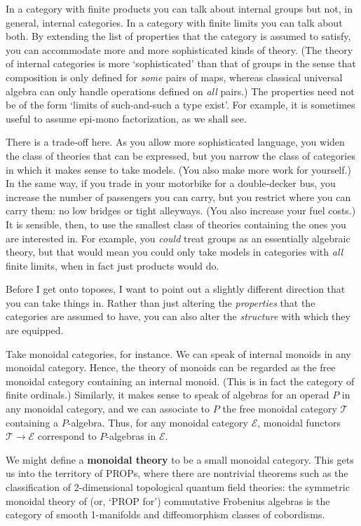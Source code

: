 \documentclass[12pt]{article}
\newcommand{\cat}[1]{\mathscr{#1}}
\newcommand{\demph}[1]{\textbf{\textup{#1}}}
\newcommand{\E}{\cat{E}}
\newcommand{\T}{\cat{T}}
\begin{document}
In a category with finite products you can talk about internal groups but not,
in general, internal categories.  In a category with finite limits you can
talk about both.  By extending the list of properties that the category is
assumed to satisfy, you can accommodate more and more sophisticated kinds of
theory.  (The theory of internal categories is more `sophisticated' than that
of groups in the sense that composition is only defined for \emph{some} pairs
of maps, whereas classical universal algebra can only handle operations
defined on \emph{all} pairs.)  The properties need not be of the form `limits
of such-and-such a type exist'.  For example, it is sometimes useful to assume
epi-mono factorization, as we shall see.

There is a trade-off here.  As you allow more sophisticated language, you
widen the class of theories that can be expressed, but you narrow the class of
categories in which it makes sense to take models.  (You also make more work
for yourself.)  In the same way, if you trade in your motorbike for a
double-decker bus, you increase the number of passengers you can carry, but
you restrict where you can carry them: no low bridges or tight alleyways.
(You also increase your fuel costs.)  It is sensible, then, to use
the smallest class of theories containing the ones you are interested in.
For example, you \emph{could} treat groups as an essentially algebraic theory,
but that would mean you could only take models in categories with \emph{all}
finite limits, when in fact just products would do.

Before I get onto toposes, I want to point out a slightly different direction
that you can take things in.  Rather than just altering the \emph{properties}
that the categories are assumed to have, you can also alter the
\emph{structure} with which they are equipped. 

Take monoidal categories, for instance.  We can speak of internal monoids in
any monoidal category.  Hence, the theory of monoids can be regarded as the
free monoidal category containing an internal monoid.  (This is in fact the
category of finite ordinals.)  Similarly, it makes sense to speak of algebras
for an operad $P$ in any monoidal category, and we can associate to $P$ the
free monoidal category $\T$ containing a $P$-algebra.  Thus, for any monoidal
category $\E$, monoidal functors $\T \to \E$ correspond to $P$-algebras in
$\E$.

We might define a \demph{monoidal theory} to be a small monoidal category.
This gets us into the territory of PROPs, where there are nontrivial theorems
such as the classification of 2-dimensional topological quantum field
theories: the symmetric monoidal theory of (or, `PROP for') commutative
Frobenius algebras is the category of smooth 1-manifolds and diffeomorphism
classes of cobordisms.
\end{document}

